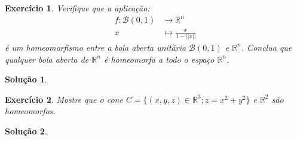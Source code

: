 \documentclass[a4paper,12pt]{article}
\newcommand{\R}{\mathbb{R}}
\newcommand{\B}{\mathcal{B}}
\theoremstyle{exer}
\newtheorem{exercise}{Exercício}
\theoremstyle{definition}
\newtheorem{solution}{Solução}
\theoremstyle{plain}
\begin{document}
\begin{exercise}
    Verifique que a aplicação:
    \begin{align*}
        f : \B(0, 1) &\to \R^n \\
        x &\mapsto \frac{x}{1 - ||x||}        
    \end{align*}
    é um homeomorfismo entre a bola aberta unitária $\B(0, 1)$ e $\R^n$.
    Conclua que qualquer bola aberta de $\R^n$ é homeomorfa a todo o espaço $\R^n$.
\end{exercise}

\begin{solution}

\end{solution}

\begin{exercise}
    Mostre que o cone $C = \{(x, y, z) \in \R^3 ; z = x^2 + y^2 \}$ e $\R^2$ são homeomorfos.
\end{exercise}

\begin{solution}

\end{solution}

\end{document}
